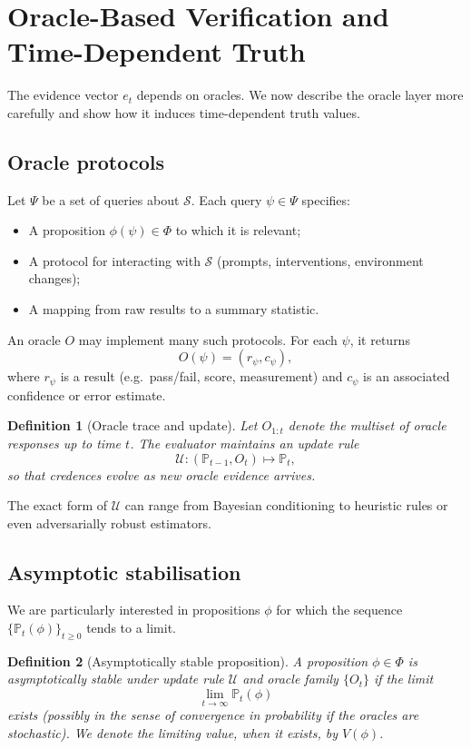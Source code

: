 \documentclass[11pt]{article}
\newtheorem{definition}{Definition}
\newcommand{\Pp}{\mathbb{P}}
\newcommand{\1}{\mathbf{1}}
\begin{document}
\section{Oracle-Based Verification and Time-Dependent Truth}

The evidence vector $e_t$ depends on oracles.
We now describe the oracle layer more carefully and show how it induces
time-dependent truth values.

\subsection{Oracle protocols}

Let $\Psi$ be a set of queries about $\mathcal{S}$.
Each query $\psi \in \Psi$ specifies:

\begin{itemize}[leftmargin=2em]
  \item A proposition $\phi(\psi) \in \Phi$ to which it is relevant;
  \item A protocol for interacting with $\mathcal{S}$ (prompts, interventions,
  environment changes);
  \item A mapping from raw results to a summary statistic.
\end{itemize}

An oracle $O$ may implement many such protocols.
For each $\psi$, it returns
\[
  O(\psi) = (r_\psi, c_\psi),
\]
where $r_\psi$ is a result (e.g.~pass/fail, score, measurement) and
$c_\psi$ is an associated confidence or error estimate.

\begin{definition}[Oracle trace and update]
Let $O_{1:t}$ denote the multiset of oracle responses up to time $t$.
The evaluator maintains an update rule
\[
  \mathcal{U}: (\Pp_{t-1}, O_t) \mapsto \Pp_t,
\]
so that credences evolve as new oracle evidence arrives.
\end{definition}

The exact form of $\mathcal{U}$ can range from Bayesian conditioning to
heuristic rules or even adversarially robust estimators.

\subsection{Asymptotic stabilisation}

We are particularly interested in propositions $\phi$ for which the sequence
$\{\Pp_t(\phi)\}_{t \ge 0}$ tends to a limit.

\begin{definition}[Asymptotically stable proposition]
A proposition $\phi \in \Phi$ is \emph{asymptotically stable} under update
rule $\mathcal{U}$ and oracle family $\{O_t\}$ if the limit
\[
  \lim_{t \to \infty} \Pp_t(\phi)
\]
exists (possibly in the sense of convergence in probability if the oracles are
stochastic).
We denote the limiting value, when it exists, by $V(\phi)$.
\end{definition}
\end{document}
